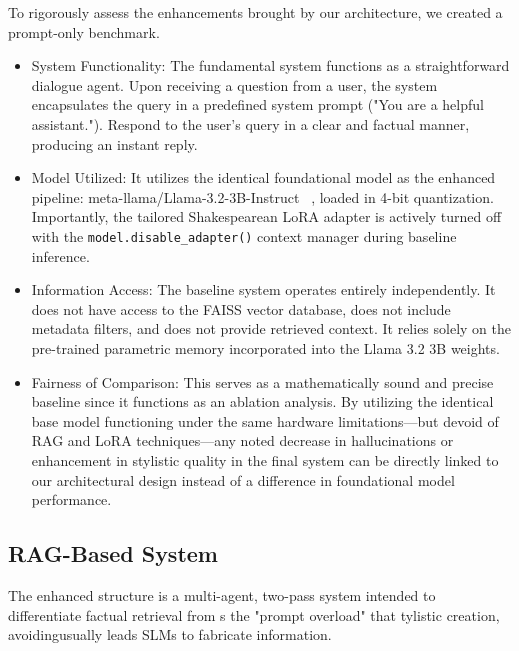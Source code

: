 \documentclass[10pt,conference]{IEEEtran}
\begin{document}
To rigorously assess the enhancements brought by our architecture, we created a prompt-only benchmark.

\begin{itemize}
    \item System Functionality: The fundamental system functions as a straightforward dialogue agent. Upon receiving a question from a user, the system encapsulates the query in a predefined system prompt ("You are a helpful assistant."). Respond to the user's query in a clear and factual manner, producing an instant reply.
    \item Model Utilized: It utilizes the identical foundational model as the enhanced pipeline: meta-llama/Llama-3.2-3B-Instruct ~\cite{grattafiori2024llama}, loaded in 4-bit quantization. Importantly, the tailored Shakespearean LoRA adapter is actively turned off with the 
    \verb|model.disable_adapter()|
    context manager during baseline inference.
    \item Information Access: The baseline system operates entirely independently. It does not have access to the FAISS vector database, does not include metadata filters, and does not provide retrieved context. It relies solely on the pre-trained parametric memory incorporated into the Llama 3.2 3B weights.
    \item Fairness of Comparison: This serves as a mathematically sound and precise baseline since it functions as an ablation analysis. By utilizing the identical base model functioning under the same hardware limitations—but devoid of RAG and LoRA techniques—any noted decrease in hallucinations or enhancement in stylistic quality in the final system can be directly linked to our architectural design instead of a difference in foundational model performance.
\end{itemize}

\subsection{RAG-Based System}

The enhanced structure is a multi-agent, two-pass system intended to differentiate factual retrieval from s the "prompt overload" that tylistic creation, avoidingusually leads SLMs to fabricate information.
\end{document}
